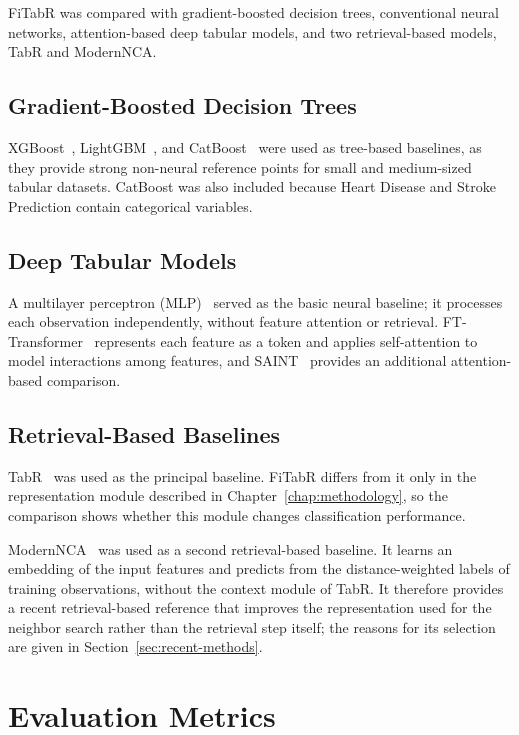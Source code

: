 \documentclass[11pt,a4paper,oneside, openany, reqno, chapter, nokorean]{oblivoir}
\theoremstyle{definition}
\theoremstyle{remark}
\numberwithin{equation}{chapter}
\theoremstyle{definition}
\theoremstyle{remark}
\theoremstyle{definition}
\begin{document}
FiTabR was compared with gradient-boosted decision trees, conventional neural
networks, attention-based deep tabular models, and two retrieval-based models,
TabR and ModernNCA.

\subsection{Gradient-Boosted Decision Trees}

XGBoost~\cite{chen2016xgboost}, LightGBM~\cite{ke2017lightgbm}, and CatBoost~\cite{prokhorenkova2018catboost} were used as tree-based baselines, as they provide strong non-neural reference points for small and medium-sized tabular datasets. CatBoost was also included because Heart Disease and Stroke Prediction contain categorical variables.

\subsection{Deep Tabular Models}

A multilayer perceptron (MLP)~\cite{rumelhart1986learning} served as the basic neural baseline; it processes each observation independently, without feature attention or retrieval. FT-Transformer~\cite{gorishniy2021revisiting} represents each feature as a token and applies self-attention to model interactions among features, and SAINT~\cite{somepalli2021saint} provides an additional attention-based comparison.

\subsection{Retrieval-Based Baselines}

TabR~\cite{gorishniy2024tabr} was used as the principal baseline. FiTabR differs from it only in the representation module described in Chapter~\ref{chap:methodology}, so the comparison shows whether this module changes classification performance.

ModernNCA~\cite{ye2025modernnca} was used as a second retrieval-based baseline. It learns an embedding of the input features and predicts from the distance-weighted labels of training observations, without the context module of TabR. It therefore provides a recent retrieval-based reference that improves the representation used for the neighbor search rather than the retrieval step itself; the reasons for its selection are given in Section~\ref{sec:recent-methods}.


\section{Evaluation Metrics}
\label{sec:metrics}
\end{document}
